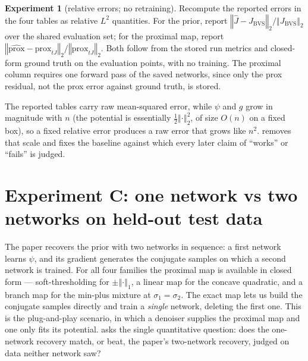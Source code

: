 \documentclass[11pt]{article}
\theoremstyle{definition}
\newtheorem{experiment}{Experiment}
\theoremstyle{remark}
\newcommand{\normsq}[1]{\left\Vert{#1} \right\Vert_{2}^{2}}
\newcommand{\norm}[1]{\left\Vert{#1} \right\Vert}
\newcommand{\normone}[1]{\left\Vert{#1} \right\Vert_{1}}
\def\JBVS {J_{\text{BVS}}}
\def\prox {\mathrm{prox}}
\begin{document}
\begin{experiment}[relative errors; no retraining]
\label{exp:rel}
Recompute the reported errors in the four tables as relative $L^{2}$ quantities.
For the prior, report $\norm{\hat{J} - \JBVS}_{2}/\norm{\JBVS}_{2}$ over the shared evaluation set; for the proximal map, report $\norm{\widehat{\prox} - \prox_{tJ}}_{2}/\norm{\prox_{tJ}}_{2}$.
Both follow from the stored run metrics and closed-form ground truth on the evaluation points, with no training.
The proximal column requires one forward pass of the saved networks, since only the prox residual, not the prox error against ground truth, is stored.
\end{experiment}

The reported tables carry raw mean-squared error, while $\psi$ and $g$ grow in magnitude with $n$ (the potential is essentially $\tfrac12\normsq{\cdot}$, of size $O(n)$ on a fixed box), so a fixed relative error produces a raw error that grows like $n^{2}$.
 removes that scale and fixes the baseline against which every later claim of ``works'' or ``fails'' is judged.

\section{Experiment C: one network vs two networks on held-out test data}
\label{sec:cmp}

The paper recovers the prior with two networks in sequence: a first network learns $\psi$, and its gradient generates the conjugate samples on which a second network is trained.
For all four families the proximal map is available in closed form --- soft-thresholding for $\pm\normone{\cdot}$, a linear map for the concave quadratic, and a branch map for the min-plus mixture at $\sigma_{1} = \sigma_{2}$.
The exact map lets us build the conjugate samples directly and train a \emph{single} network, deleting the first one.
This is the plug-and-play scenario, in which a denoiser supplies the proximal map and one only fits its potential.
 asks the single quantitative question: does the one-network recovery match, or beat, the paper's two-network recovery, judged on data neither network saw?
\end{document}
